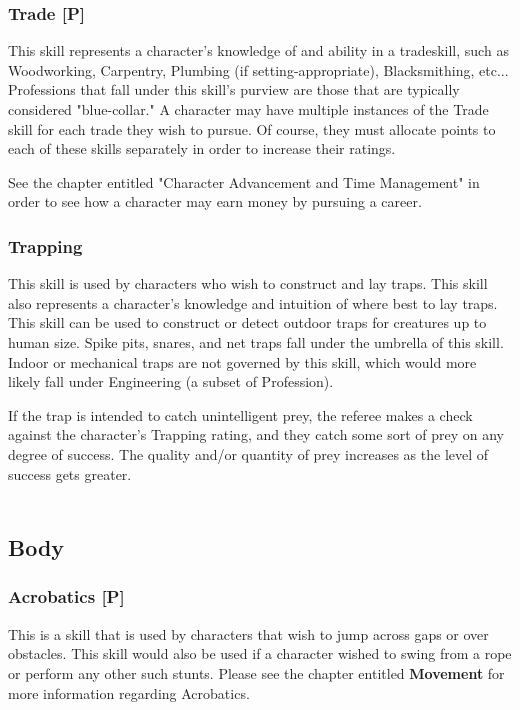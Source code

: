 \documentclass[oneside]{book}
\begin{document}
\begin{multicols}{2}
\subsubsection{Trade [P]}
This skill represents a character's knowledge of and ability in a tradeskill, such as Woodworking, Carpentry, Plumbing (if setting-appropriate), Blacksmithing, etc... Professions that fall under this skill's purview are those that are typically considered "blue-collar."  A character may have multiple instances of the Trade skill for each trade they wish to pursue. Of course, they must allocate points to each of these skills separately in order to increase their ratings. 

See the chapter entitled "Character Advancement and Time Management" in order to see how a character may earn money by pursuing a career. 

\subsubsection{Trapping}
This skill is used by characters who wish to construct and lay traps. This skill also represents a character's knowledge and intuition of where best to lay traps. This skill can be used to construct or detect outdoor traps for creatures up to human size. Spike pits, snares, and net traps fall under the umbrella of this skill. Indoor or mechanical traps are not governed by this skill, which would more likely fall under Engineering (a subset of Profession).

If the trap is intended to catch unintelligent prey, the referee makes a check against the character's Trapping rating, and they catch some sort of prey on any degree of success. The quality and/or quantity of prey increases as the level of success gets greater. 
\\
\\
\subsection{Body}
\subsubsection{Acrobatics [P]}
This is a skill that is used by characters that wish to jump across gaps or over obstacles. This skill would also be used if a character wished to swing from a rope or perform any other such stunts. Please see the chapter entitled \textbf{Movement} for more information regarding Acrobatics.


\end{multicols}
\end{document}
